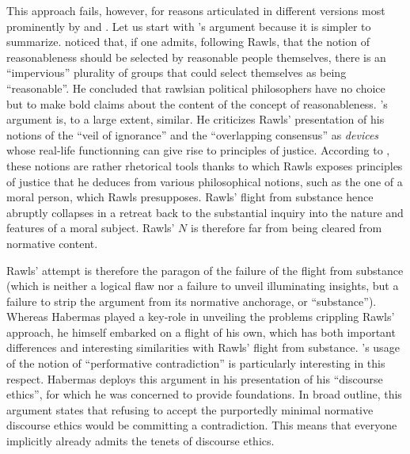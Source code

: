 \documentclass[preprint, french, english, 11pt, authoryear]{elsarticle}%
\begin{document}
This approach fails, however, for reasons articulated in different versions most prominently by \cite{habermas_reconciliation_1995} and \cite{estlund_democratic_2009}. Let us start with \cite{estlund_democratic_2009}'s argument because it is simpler to summarize. \cite{estlund_democratic_2009} noticed that, if one admits, following Rawls, that the notion of reasonableness should be selected by reasonable people themselves, there is an ``impervious'' plurality of groups that could select themselves as being ``reasonable''. He concluded that rawlsian political philosophers have no choice but to make bold claims about the content of the concept of reasonableness. \cite{habermas_reconciliation_1995}'s argument is, to a large extent, similar. He criticizes Rawls' presentation of his notions of the ``veil of ignorance'' and the ``overlapping consensus'' as \emph{devices} whose real-life functionning can give rise to principles of justice. According to \cite{habermas_reconciliation_1995}, these notions are rather rhetorical tools thanks to which Rawls exposes principles of justice that he deduces from various philosophical notions, such as the one of a moral person, which Rawls presupposes. Rawls' flight from substance hence abruptly collapses in a retreat back to the substantial inquiry into the nature and features of a moral subject.  Rawls' $N$ is therefore far from being cleared from normative content.

Rawls' attempt is therefore the paragon of the failure of the flight from substance (which is neither a logical flaw nor a failure to unveil illuminating insights, but a failure to strip the argument from its normative anchorage, or ``substance''). Whereas Habermas played a key-role in unveiling the problems crippling Rawls' approach, he himself embarked on a flight of his own, which has both important differences and interesting similarities with Rawls' flight from substance. \cite{habermas_moralbewustsein_1983}'s usage of the notion of ``performative contradiction'' is particularly interesting in this respect. Habermas deploys this argument in his presentation of his ``discourse ethics'', for which he was concerned to provide foundations. In broad outline, this argument states that refusing to accept the purportedly minimal normative discourse ethics would be committing a contradiction. This means that everyone implicitly already admits the tenets of discourse ethics.%
\end{document}
